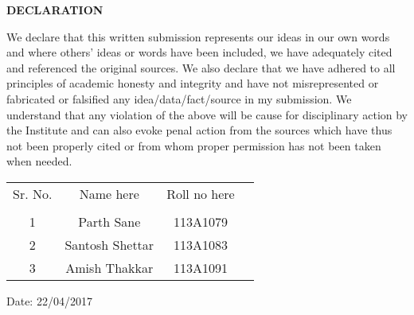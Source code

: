 \newpage
\thispagestyle{empty}

\begin{center}
\large {\textbf{DECLARATION}}\\[0.5cm]
\end{center}

\normalsize We declare that this written submission represents our ideas in our own words and where others’ ideas or words have been included, we have adequately cited and referenced the original sources. We also declare that we have adhered to all principles of academic honesty and integrity and have not misrepresented or fabricated or falsified any idea/data/fact/source in my submission. We understand that any violation of the above will be cause for disciplinary action by the Institute and can also evoke penal action from the sources which have thus not been properly cited or from whom proper permission has not been taken when needed.\\[1.0cm]

\begin{table}[h]
\centering
\begin{tabular}{c c c c}
Sr. No. & Name here &  Roll no here\\
\\
1 & Parth Sane &  113A1079 \\ 
2 & Santosh Shettar &  113A1083\\
3 & Amish Thakkar &  113A1091 \\
\end{tabular}
\end{table}

\vspace{2cm}

\normalsize Date: 22/04/2017